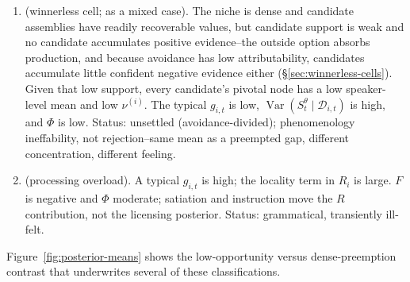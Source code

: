 \begin{enumerate}
\item {}  (winnerless cell;  as a mixed case). The niche is dense and candidate assemblies have readily recoverable values, but candidate support is weak and no candidate accumulates positive evidence--the outside option absorbs production, and because avoidance has low attributability, candidates accumulate little confident negative evidence either (\S\ref{sec:winnerless-cells}). Given that low support, every candidate's pivotal node has a low speaker-level mean and low $\nu^{(i)}$. The typical $g_{i,t}$ is low, $\operatorname{Var}(S_t^{\theta}\mid\mathcal{D}_{i,t})$ is high, and $\Phi$ is low. Status: unsettled (avoidance-divided); phenomenology ineffability, not rejection--same mean as a preempted gap, different concentration, different feeling.

\item {} (processing overload). A typical $g_{i,t}$ is high; the locality term in $R_i$ is large. $F$ is negative and $\Phi$ moderate; satiation and instruction move the $R$ contribution, not the licensing posterior. Status: grammatical, transiently ill-felt.
\end{enumerate}

Figure~\ref{fig:posterior-means} shows the low-opportunity versus dense-preemption contrast that underwrites several of these classifications.

